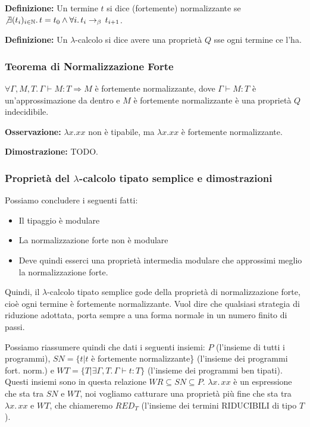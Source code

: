 \documentclass{article}
\begin{document}
\noindent \textbf{Definizione:} Un termine $t$ si dice (fortemente) normalizzante se $\not\exists(t_i)_{i\in\mathbb{N}}.\, t = t_0 \land \forall i.\,t_i\to_\beta\,t_{i+1}$.

\noindent \textbf{Definizione:} Un $\lambda$-calcolo si dice avere una proprietà $Q$ sse ogni termine ce l'ha.


\subsubsection{Teorema di Normalizzazione Forte}
$\forall\Gamma,M,T.\, \Gamma \vdash M:T \Rightarrow M$ è fortemente normalizzante, dove $\Gamma \vdash M:T$ è un'approssimazione da dentro e $M$ è fortemente normalizzante è una proprietà $Q$ indecidibile.

\bigskip

\noindent \textbf{Osservazione:} $\lambda x.xx$ non è tipabile, ma $\lambda x.xx$ è fortemente normalizzante.

\bigskip

\textbf{Dimostrazione:} TODO.

\subsubsection{Proprietà del $\lambda$-calcolo tipato semplice e dimostrazioni}
Possiamo concludere i seguenti fatti:
\begin{itemize}
    \item Il tipaggio è modulare
    \item La normalizzazione forte non è modulare
    \item Deve quindi esserci una proprietà intermedia modulare che approssimi meglio la normalizzazione forte.
\end{itemize}
Quindi, il $\lambda$-calcolo tipato semplice gode della proprietà di normalizzazione forte, cioè ogni termine è fortemente normalizzante. Vuol dire che qualsiasi strategia di riduzione adottata, porta sempre a una forma normale in un numero finito di passi.

\bigskip

Possiamo riassumere quindi che dati i seguenti insiemi: $P$ (l'insieme di tutti i programmi), $SN = \{ t | t$ è fortemente normalizzante\} (l'insieme dei programmi fort. norm.) e $WT = \{T | \exists \Gamma,T.\,\Gamma\vdash t:T\}$ (l'insieme dei programmi ben tipati). Questi insiemi sono in questa relazione $WR \subseteq SN \subseteq P$. $\lambda x.\, xx$ è un espressione che sta tra $SN$ e $WT$, noi vogliamo catturare una proprietà più fine che sta tra $\lambda x.\, xx$ e $WT$, che chiameremo $RED_T$ (l'insieme dei termini RIDUCIBILI di tipo $T$).
\end{document}
